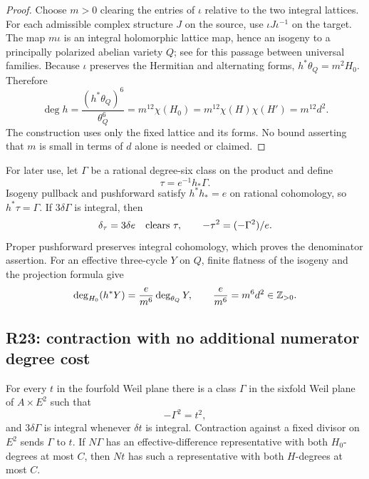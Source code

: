 \begin{proof}
Choose $m>0$ clearing the entries of $\iota$ relative to the two integral lattices. For each admissible complex structure $J$ on the source, use $\iota J\iota^{-1}$ on the target. The map $m\iota$ is an integral holomorphic lattice map, hence an isogeny to a principally polarized abelian variety $Q$; see \cite[\S6]{Schoen1998} for this passage between universal families. Because $\iota$ preserves the Hermitian and alternating forms, $h^*\theta_Q=m^2H_0$. Therefore
\[
\deg h=\frac{(h^*\theta_Q)^6}{\theta_Q^6}
=m^{12}\chi(H_0)
=m^{12}\chi(H)\chi(H')=m^{12}d^2.
\]
The construction uses only the fixed lattice and its forms. No bound asserting that $m$ is small in terms of $d$ alone is needed or claimed.
\end{proof}

For later use, let $\Gamma$ be a rational degree-six class on the product and define
\[
\tau=e^{-1}h_*\Gamma.
\]
Isogeny pullback and pushforward satisfy $h^*h_*=e$ on rational cohomology, so $h^*\tau=\Gamma$. If $3\delta\Gamma$ is integral, then
\begin{equation}
\delta_\tau=3\delta e\quad\hbox{clears }\tau,
\qquad
-\tau^2=(-\Gamma^2)/e.
\label{eq:comp-class-data}
\end{equation}
Proper pushforward preserves integral cohomology, which proves the denominator assertion. For an effective three-cycle $Y$ on $Q$, finite flatness of the isogeny and the projection formula give
\begin{equation}
\deg_{H_0}(h^*Y)
=\frac{e}{m^6}\deg_{\theta_Q}Y,
\qquad \frac{e}{m^6}=m^6d^2\in\mathbb Z_{>0}.
\label{eq:comp-pullback-degree}
\end{equation}

\subsection{R23: contraction with no additional numerator degree cost}

\begin{proposition}[R23]
\label{prop:R23}
For every $t$ in the fourfold Weil plane there is a class $\Gamma$ in the sixfold Weil plane of $A\times E^2$ such that
\[
-\Gamma^2=t^2,
\]
and $3\delta\Gamma$ is integral whenever $\delta t$ is integral. Contraction against a fixed divisor on $E^2$ sends $\Gamma$ to $t$. If $N\Gamma$ has an effective-difference representative with both $H_0$-degrees at most $C$, then $Nt$ has such a representative with both $H$-degrees at most $C$.
\end{proposition}

